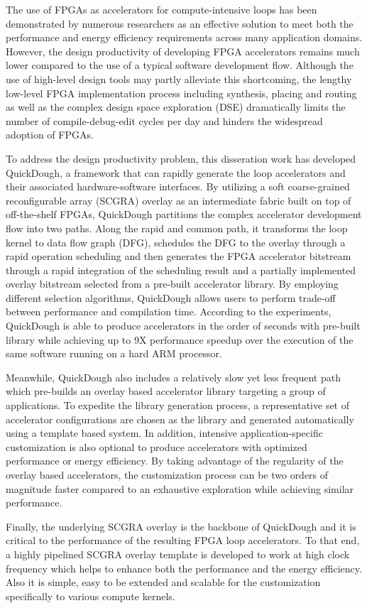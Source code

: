 The use of FPGAs as accelerators for compute-intensive loops has been demonstrated by numerous researchers as an effective solution to meet both the performance and energy efficiency requirements across many application domains. However, the design productivity of developing FPGA accelerators remains much lower compared to the use of a typical software development flow. Although the use of high-level design tools may partly alleviate this shortcoming, the lengthy low-level FPGA implementation process including synthesis, placing and routing as well as the complex design space exploration (DSE) dramatically limits the number of compile-debug-edit cycles per day and hinders the widespread adoption of FPGAs. 

To address the design productivity problem, this disseration work has developed QuickDough, a framework that can rapidly generate the loop accelerators and their associated hardware-software interfaces. By utilizing a soft coarse-grained reconfigurable array (SCGRA) overlay as an intermediate fabric built on top of off-the-shelf FPGAs, QuickDough partitions the complex accelerator development flow into two paths. Along the rapid and common path, it transforms the loop kernel to data flow graph (DFG), schedules the DFG to the overlay through a rapid operation scheduling and then generates the FPGA accelerator bitstream through a rapid integration of the scheduling result and a partially implemented overlay bitstream selected from a pre-built accelerator library. By employing different selection algorithms, QuickDough allows users to perform trade-off between performance and compilation time. According to the experiments, QuickDough is able to produce accelerators in the order of seconds with pre-built library while achieving up to 9X performance speedup over the execution of the same software running on a hard ARM processor. 

Meanwhile, QuickDough also includes a relatively slow yet less frequent path which pre-builds an overlay based accelerator library targeting a group of applications. To expedite the library generation process, a representative set of accelerator configurations are chosen as the library and generated automatically using a template based system. In addition, intensive application-specific customization is also optional to produce accelerators with optimized performance or energy efficiency. By taking advantage of the regularity of the overlay based accelerators, the customization process can be two orders of magnitude faster compared to an exhaustive exploration while achieving similar performance.

Finally, the underlying SCGRA overlay is the backbone of QuickDough and it is critical to the performance of the resulting FPGA loop accelerators. To that end, a highly pipelined SCGRA overlay template is developed to work at high clock frequency which helps to enhance both the performance and the energy efficiency. Also it is simple, easy to be extended and scalable for the customization specifically to various compute kernels.

